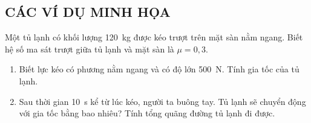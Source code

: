 \subsection{CÁC VÍ DỤ MINH HỌA}
\setcounter{ex}{0}
\begin{ex}
	\loigiai{}
\end{ex}
\begin{ex}
	Một tủ lạnh có khối lượng \SI{120}{\kilogram} được kéo trượt trên mặt sàn nằm ngang. Biết hệ số ma sát trượt giữa tủ lạnh và mặt sàn là $\mu=0,3$.
	\begin{enumerate}[label=\alph*)]
		\item Biết lực kéo có phương nằm ngang và có độ lớn \SI{500}{\newton}. Tính gia tốc của tủ lạnh.
		\item Sau thời gian \SI{10}{\second} kể từ lúc kéo, người ta buông tay. Tủ lạnh sẽ chuyển động với gia tốc bằng bao nhiêu? Tính tổng quãng đường tủ lạnh đi được.
	\end{enumerate}
	\loigiai{}
\end{ex}
